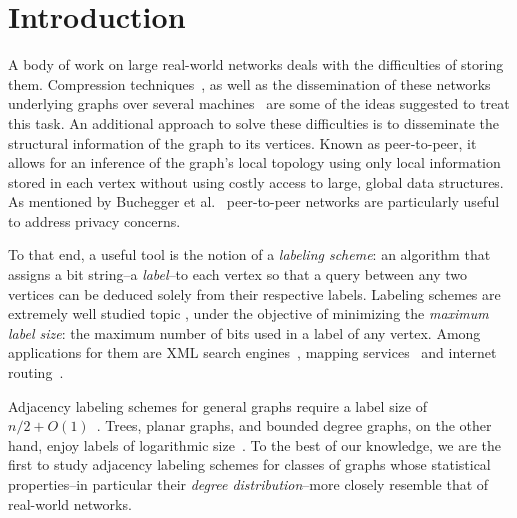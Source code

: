 

\section{Introduction}
A body of work on large real-world networks  deals with the difficulties of storing them.
Compression techniques~\cite{boldi2004webgraph,boldi2011layered}, as  well as the dissemination  of these networks underlying graphs over several machines~\cite{gonzalez2012powergraph, stanton2012streaming} are some of the ideas suggested to treat this task.
An additional  approach to solve these difficulties is to disseminate the structural information of the graph to its vertices.
 Known as peer-to-peer, it  allows for an inference of the graph's local topology  using only local information stored in each vertex without using costly access to large, global data structures. 
As mentioned by   Buchegger et al.~\cite{buchegger2009peerson}  peer-to-peer  networks are particularly useful to address privacy concerns.

To that end, a useful tool is the notion of a \emph{labeling scheme}: an algorithm that assigns a bit string--a \emph{label}--to each vertex so that a query between any two vertices can be deduced solely from their respective labels. 
Labeling schemes are extremely well studied topic \cite{}, under the objective of  minimizing the \emph{maximum label size}: the maximum number of bits used in a label of any vertex. Among applications for them are   XML search engines~\cite{cohen2010labeling}, mapping services~\cite{abraham2011hub} and internet routing~\cite{krioukov2004compact}.

Adjacency labeling schemes for general graphs  require a label size of $n/2+O(1)$~\cite{moon1965minimal, alstrup2014adjacency}.
Trees, planar graphs, and bounded degree graphs, on the other hand,   enjoy labels of logarithmic size~\cite{Alstrup02, gavoille2007shorter, adjiashvili2014labeling}. 
To the best of our knowledge, we are the first to study adjacency labeling schemes for classes of graphs whose statistical properties--in particular their \emph{degree distribution}--more closely resemble that of real-world networks.

